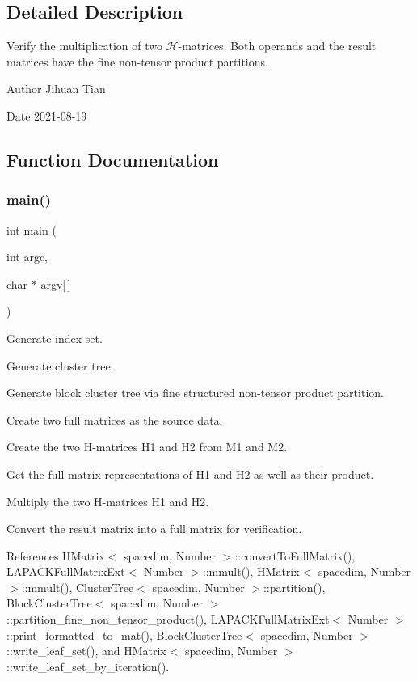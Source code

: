 \subsection{Detailed Description}
Verify the multiplication of two $\mathcal{H}$-\/matrices. Both operands and the result matrices have the fine non-\/tensor product partitions. 

\begin{DoxyAuthor}{Author}
Jihuan Tian 
\end{DoxyAuthor}
\begin{DoxyDate}{Date}
2021-\/08-\/19 
\end{DoxyDate}


\subsection{Function Documentation}
\mbox{\label{hmatrix-hmatrix-mmult-all-fine-ntp_8cc_a0ddf1224851353fc92bfbff6f499fa97}} 
\subsubsection{\texorpdfstring{main()}{main()}}
{\footnotesize\ttfamily int main (\begin{DoxyParamCaption}\item[{int}]{argc,  }\item[{char $\ast$}]{argv\mbox{[}$\,$\mbox{]} }\end{DoxyParamCaption})}

Generate index set.

Generate cluster tree.

Generate block cluster tree via fine structured non-\/tensor product partition.

Create two full matrices as the source data.

Create the two H-\/matrices {\ttfamily H1} and {\ttfamily H2} from {\ttfamily M1} and {\ttfamily M2}.

Get the full matrix representations of {\ttfamily H1} and {\ttfamily H2} as well as their product.

Multiply the two H-\/matrices {\ttfamily H1} and {\ttfamily H2}.

Convert the result matrix into a full matrix for verification.

References H\+Matrix$<$ spacedim, Number $>$\+::convert\+To\+Full\+Matrix(), L\+A\+P\+A\+C\+K\+Full\+Matrix\+Ext$<$ Number $>$\+::mmult(), H\+Matrix$<$ spacedim, Number $>$\+::mmult(), Cluster\+Tree$<$ spacedim, Number $>$\+::partition(), Block\+Cluster\+Tree$<$ spacedim, Number $>$\+::partition\+\_\+fine\+\_\+non\+\_\+tensor\+\_\+product(), L\+A\+P\+A\+C\+K\+Full\+Matrix\+Ext$<$ Number $>$\+::print\+\_\+formatted\+\_\+to\+\_\+mat(), Block\+Cluster\+Tree$<$ spacedim, Number $>$\+::write\+\_\+leaf\+\_\+set(), and H\+Matrix$<$ spacedim, Number $>$\+::write\+\_\+leaf\+\_\+set\+\_\+by\+\_\+iteration().

